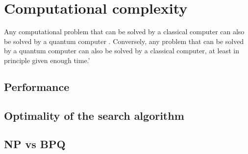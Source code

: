 \section{Computational complexity}
Any computational problem that can be solved by a classical computer can also be solved by a quantum computer \cite[29]{NielsenChuang}. Conversely, any problem that can be solved by a quantum computer can also be solved by a classical computer, at least in principle given enough time.'
\subsection{Performance}\label{sec:performance}
\subsection{Optimality of the search algorithm}
\subsection{NP vs BPQ}
